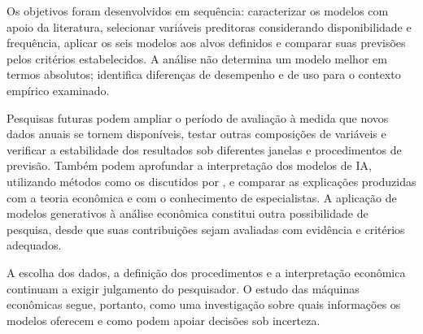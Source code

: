 Os objetivos foram desenvolvidos em sequência: caracterizar os modelos com apoio da literatura, selecionar variáveis preditoras considerando disponibilidade e frequência, aplicar os seis modelos aos alvos definidos e comparar suas previsões pelos critérios estabelecidos. A análise não determina um modelo melhor em termos absolutos; identifica diferenças de desempenho e de uso para o contexto empírico examinado.

Pesquisas futuras podem ampliar o período de avaliação à medida que novos dados anuais se tornem disponíveis, testar outras composições de variáveis e verificar a estabilidade dos resultados sob diferentes janelas e procedimentos de previsão. Também podem aprofundar a interpretação dos modelos de IA, utilizando métodos como os discutidos por , e comparar as explicações produzidas com a teoria econômica e com o conhecimento de especialistas. A aplicação de modelos generativos à análise econômica constitui outra possibilidade de pesquisa, desde que suas contribuições sejam avaliadas com evidência e critérios adequados.

A escolha dos dados, a definição dos procedimentos e a interpretação econômica continuam a exigir julgamento do pesquisador. O estudo das máquinas econômicas segue, portanto, como uma investigação sobre quais informações os modelos oferecem e como podem apoiar decisões sob incerteza.





